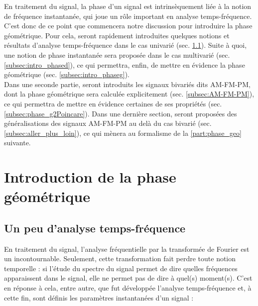 
En traitement du signal, la phase d'un signal est intrinsèquement liée à la notion de fréquence instantanée, qui joue un rôle important en analyse temps-fréquence. 
C'est donc de ce point que commencera notre discussion pour introduire la phase géométrique.
Pour cela, seront rapidement introduites quelques notions et résultats d'analyse temps-fréquence dans le cas univarié (sec. \ref{subsec:ana_temp-freq}). Suite à quoi, une notion de phase instantanée sera proposée dans le cas multivarié (sec. \ref{subsec:intro_phased}), ce qui permettra, enfin, de mettre en évidence la phase géométrique (sec. \ref{subsec:intro_phaseg}).
\\

Dans une seconde partie, seront introduits les signaux bivariés dits AM-FM-PM, dont la phase géométrique sera calculée explicitement (sec. \ref{subsec:AM-FM-PM}), ce qui permettra de mettre en évidence certaines de ses propriétés (sec. \ref{subsec:phase_g2Poincare}). Dans une dernière section, seront proposées des généralisations des signaux AM-FM-PM au delà du cas bivarié (sec. \ref{subsec:aller_plus_loin}), ce qui mènera au formalisme de la \cref{part:phase_geo} suivante.
\\




\section{Introduction de la phase géométrique} \label{sec:intro_phaseg}

\subsection{Un peu d'analyse temps-fréquence} \label{subsec:ana_temp-freq}

En traitement du signal, l'analyse fréquentielle par la transformée de Fourier est un incontournable. 
Seulement, cette transformation fait perdre toute notion temporelle : si l'étude du spectre du signal permet de dire quelles fréquences apparaissent dans le signal, elle ne permet pas de dire à quel(s) moment(s). 
C'est en réponse à cela, entre autre, que fut développée l'analyse temps-fréquence et, à cette fin, sont définis les paramètres instantanées d'un signal :\par

